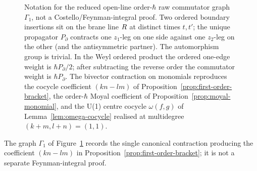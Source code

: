 \documentclass[11pt]{memoir}
\begin{document}
\begin{figure}[H]
  \centering
  \caption{Notation for the reduced open-line order-\(\hbar\) raw
    commutator graph $\Gamma_1$, not a Costello/Feynman-integral proof.
    Two ordered boundary insertions sit on the brane line $R$ at
    distinct times $t,t'$; the unique propagator $P_\partial$
    contracts one $z_1$-leg on one side against one $z_2$-leg on the
    other (and the antisymmetric partner). The automorphism group is
    trivial. In the Weyl ordered product the ordered one-edge weight is
    $\hbar P_\partial/2$; after subtracting the reverse order the
    commutator weight is $\hbar P_\partial$. The bivector contraction
    on monomials reproduces
    the cocycle coefficient $(kn-lm)$ of
    Proposition~\ref{prop:first-order-bracket}, the order-$\hbar$ Moyal
    coefficient of Proposition~\ref{prop:moyal-monomial}, and the U(1)
    centre cocycle $\omega(f,g)$ of Lemma~\ref{lem:omega-cocycle}
    realised at multidegree $(k+m,l+n)=(1,1)$.}
  \label{fig:gamma1}
\end{figure}
The graph $\Gamma_1$ of Figure~\ref{fig:gamma1} records the single canonical
contraction producing the coefficient $(kn-lm)$ in
Proposition~\ref{prop:first-order-bracket}; it is not a separate
Feynman-integral proof.
\end{document}
